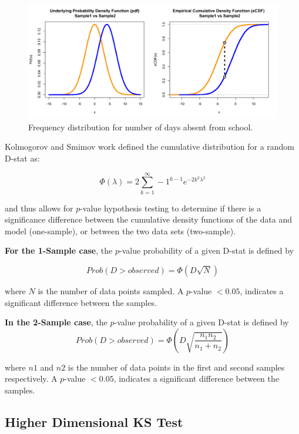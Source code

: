 \documentclass[codesnippet]{jss}
\begin{document}
\begin{figure}[t!]
\centering
\includegraphics{pdfvsCDF}
\caption{\label{fig:kstest1D} Frequency distribution for number of days absent
from school.}
\end{figure}

Kolmogorov and Smimov work defined the cumulative distribution for a random D-stat as:

\begin{equation} \label{eq:1}
\Phi(\lambda) = 2 \sum_{k=1}^{\infty} -1^{k-1}e^{-2k^2\lambda^2}
\end{equation}

and thus allows for $p$-value hypothesis testing to determine if there is a significance difference between the cumulative density functions of the data and model (one-sample), or between the two data sets (two-sample).

\textbf{For the 1-Sample case}, the $p$-value probability of a given D-stat is defined by

\begin{equation} \label{eq:2}
Prob(D > observed) = \Phi ( D\sqrt{N})
\end{equation}

where $N$ is the number of data points sampled. A $p$-value $< 0.05$, indicates a significant difference between the samples.

\textbf{In the 2-Sample case}, the $p$-value probability of a given D-stat is defined by
\begin{equation} \label{eq:3}
Prob(D > observed) = \Phi ( D\sqrt{\frac{n_1n_2}{n_1+n_2}})
\end{equation}

where $n1$ and $n2$ is the number of data points in the first and second samples respectively. A $p$-value $< 0.05$, indicates a significant difference between the samples.

\subsection{Higher Dimensional KS Test}
\end{document}
